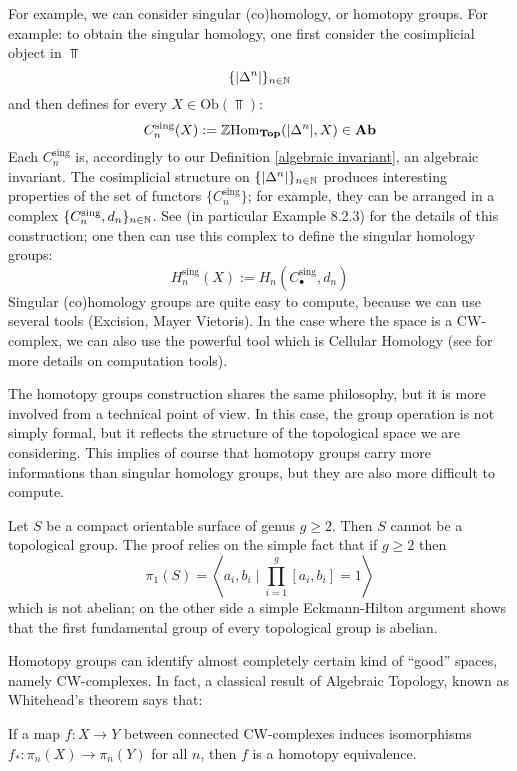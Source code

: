 For example, we can consider singular (co)homology, or homotopy groups. For example: to obtain the singular homology, one first consider the cosimplicial object in $\Top$
\[
\{|\Delta^n|\}_{n \in \mathbb{N}}
\]
and then defines for every $X \in \mathrm{Ob}(\Top)$:
\[
C_n^{\mathrm{sing}}(X) := \mathbb{Z} \mathrm{Hom}_{\mathbf{Top}}(|\Delta^n|,X) \in \mathbf{Ab}
\]
Each $C_n^{\mathrm{sing}}$ is, accordingly to our Definition \ref{algebraic invariant}, an algebraic invariant. The cosimplicial structure on $\{|\Delta^n|\}_{n \in \mathbb{N}}$ produces interesting properties of the set of functors $\{C_n^{\mathrm{sing}}\}$; for example, they can be arranged in a complex $\{C_n^{\mathrm{sing}},d_n\}_{n \in \mathbb{N}}$. See \cite[Ch. 8.2]{weibel} (in particular Example 8.2.3) for the details of this construction; one then can use this complex to define the singular homology groups:
\[
H_n^{\mathrm{sing}}(X) := H_n(C_\bullet^{\mathrm{sing}},d_n)
\]
Singular (co)homology groups are quite easy to compute, because we can use several tools (Excision, Mayer Vietoris). In the case where the space is a CW-complex, we can also use the powerful tool which is Cellular Homology (see \cite[Ch. 2.2]{hatcher} for more details on computation tools).

The homotopy groups construction shares the same philosophy, but it is more involved from a technical point of view. In this case, the group operation is not simply formal, but it reflects the structure of the topological space we are considering. This implies of course that homotopy groups carry more informations than singular homology groups, but they are also more difficult to compute.

\begin{eg}
Let $S$ be a compact orientable surface of genus $g \ge 2$. Then $S$ cannot be a topological group. The proof relies on the simple fact that if $g \ge 2$ then
\[
\pi_1(S) = \left\langle a_i,b_i \mid \prod_{i = 1}^g [a_i,b_i] = 1 \right\rangle
\]
which is not abelian; on the other side a simple Eckmann-Hilton argument shows that the first fundamental group of every topological group is abelian.
\end{eg}

Homotopy groups can identify almost completely certain kind of ``good'' spaces, namely CW-complexes. In fact, a classical result of Algebraic Topology, known as Whitehead's theorem says that:

\begin{thm} \label{thm concrete whitehead}
If a map $f \colon X \to Y$ between connected CW-complexes induces isomorphisms $f_* \colon \pi_n(X) \to \pi_n(Y)$ for all $n$, then $f$ is a homotopy equivalence.
\end{thm}

